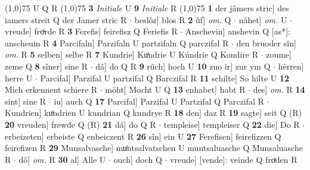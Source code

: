 \documentclass[8pt,a4paper,notitlepage]{article}
\begin{document}
\begin{table}[ht]
\begin{minipage}[t]{0.5\linewidth}
\scriptsize
\line(1,0){75} \newline
U Q R \newline
\line(1,0){75} \newline
\textbf{3} \textit{Initiale} U  \textbf{9} \textit{Initiale} R  \newline
\line(1,0){75} \newline
\textbf{1} der jâmers stric] des iamers streit Q der Jamer stric R  $\cdot$ beslôz] blos R \textbf{2} ûf] \textit{om.} Q  $\cdot$ nâhet] \textit{om.} U  $\cdot$ vreude] froͯrde R \textbf{3} Ferefis] feirefisz Q Feriefis R  $\cdot$ Anschevin] anshevin Q [as*]: anscheuin R \textbf{4} Parcifaln] Parzifaln U partzifaln Q parczifal R  $\cdot$ den bruoder sîn] \textit{om.} R \textbf{5} selben] selbe R \textbf{7} Kundrie] Kuͦndrie U Kúndrie Q Kondire R  $\cdot$ zoume] zeme Q \textbf{8} sîner] sine R  $\cdot$ dâ] do Q R \textbf{9} rûch] hoch U \textbf{10} zuo ir] zur ym Q  $\cdot$ hêrren] herre U  $\cdot$ Parcifal] Parzifal U partzifal Q Barczifal R \textbf{11} schilte] So hilte U \textbf{12} Mich erkennent schiere R  $\cdot$ möht] Mocht U Q \textbf{13} enhabet] habt R  $\cdot$ des] \textit{om.} R \textbf{14} sint] sine R  $\cdot$ iu] auch Q \textbf{17} Parcifal] Parzifal U Partzifal Q Parczifal R  $\cdot$ Kundrien] kuͦndrien U kundrian Q kundrye R \textbf{18} den] daz R \textbf{19} sagte] seit Q (R) \textbf{20} vreuden] frewde Q (R) \textbf{21} dâ] do Q R  $\cdot$ templeise] templeiser Q \textbf{22} die] Do R  $\cdot$ erbeizeten] erbeiste Q enbeiczent R \textbf{26} sîn] ein U \textbf{27} Ferefisen] feirefizzen Q feirefizen R \textbf{29} Munsalvasche] muͦntsalvatschen U muntsaluasche Q Munsaluasche R  $\cdot$ dô] \textit{om.} R \textbf{30} al] Alle U  $\cdot$ ouch] doch Q  $\cdot$ vreude] [vende]: veinde Q froͯden R \newline
\end{minipage}
\end{table}
\end{document}
